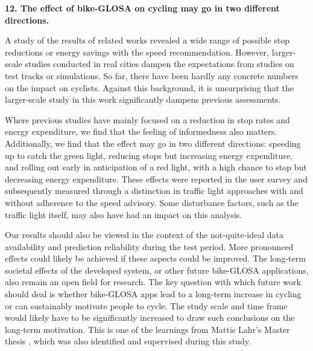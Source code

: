 \textbf{\color{cidarkblue}12. The effect of bike-GLOSA on cycling may go in two different directions.} 

A study of the results of related works revealed a wide range of possible stop reductions or energy savings with the speed recommendation. However, larger-scale studies conducted in real cities dampen the expectations from studies on test tracks or simulations. So far, there have been hardly any concrete numbers on the impact on cyclists. Against this background, it is unsurprising that the larger-scale study in this work significantly dampens previous assessments. 

Where previous studies have mainly focused on a reduction in stop rates and energy expenditure, we find that the feeling of informedness also matters. Additionally, we find that the effect may go in two different directions: speeding up to catch the green light, reducing stops but increasing energy expenditure, and rolling out early in anticipation of a red light, with a high chance to stop but decreasing energy expenditure. These effects were reported in the user survey and subsequently measured through a distinction in traffic light approaches with and without adherence to the speed advisory. Some disturbance factors, such as the traffic light itself, may also have had an impact on this analysis.

Our results should also be viewed in the context of the not-quite-ideal data availability and prediction reliability during the test period. More pronounced effects could likely be achieved if these aspects could be improved. The long-term societal effects of the developed system, or other future bike-GLOSA applications, also remain an open field for research. The key question with which future work should deal is whether bike-GLOSA apps lead to a long-term increase in cycling or can sustainably motivate people to cycle. The study scale and time frame would likely have to be significantly increased to draw such conclusions on the long-term motivation. This is one of the learnings from Mattis Lahr's Master thesis \cite{lahr_2023}, which was also identified and supervised during this study.

